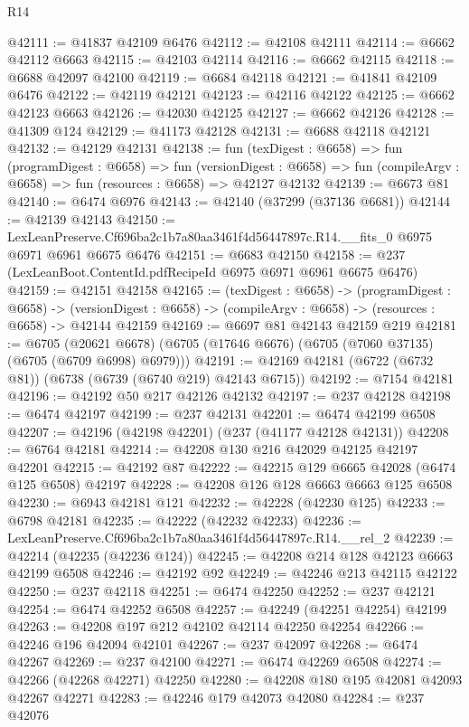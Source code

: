 \begin{lexlean}{R14}
\begin{coremodule}
@42111 := @41837 @42109 @6476
@42112 := @42108 @42111
@42114 := @6662 @42112 @6663
@42115 := @42103 @42114
@42116 := @6662 @42115
@42118 := @6688 @42097 @42100
@42119 := @6684 @42118
@42121 := @41841 @42109 @6476
@42122 := @42119 @42121
@42123 := @42116 @42122
@42125 := @6662 @42123 @6663
@42126 := @42030 @42125
@42127 := @6662 @42126
@42128 := @41309 @124
@42129 := @41173 @42128
@42131 := @6688 @42118 @42121
@42132 := @42129 @42131
@42138 := fun (texDigest : @6658) =>
  fun (programDigest : @6658) =>
  fun (versionDigest : @6658) =>
  fun (compileArgv : @6658) => fun (resources : @6658) => @42127 @42132
@42139 := @6673 @81
@42140 := @6474 @6976
@42143 := @42140 (@37299 (@37136 @6681))
@42144 := @42139 @42143
@42150 := LexLeanPreserve.Cf696ba2c1b7a80aa3461f4d56447897c.R14.__fits_0
    @6975
    @6971
    @6961
    @6675
    @6476
@42151 := @6683 @42150
@42158 := @237 (LexLeanBoot.ContentId.pdfRecipeId @6975 @6971 @6961 @6675 @6476)
@42159 := @42151 @42158
@42165 := (texDigest : @6658) ->
  (programDigest : @6658) ->
  (versionDigest : @6658) -> (compileArgv : @6658) -> (resources : @6658) -> @42144 @42159
@42169 := @6697 @81 @42143 @42159 @219
@42181 := @6705
    (@20621 @6678)
    (@6705 (@17646 @6676) (@6705 (@7060 @37135) (@6705 (@6709 @6998) @6979)))
@42191 := @42169 @42181 (@6722 (@6732 @81)) (@6738 (@6739 (@6740 @219) @42143 @6715))
@42192 := @7154 @42181
@42196 := @42192 @50 @217 @42126 @42132
@42197 := @237 @42128
@42198 := @6474 @42197
@42199 := @237 @42131
@42201 := @6474 @42199 @6508
@42207 := @42196 (@42198 @42201) (@237 (@41177 @42128 @42131))
@42208 := @6764 @42181
@42214 := @42208 @130 @216 @42029 @42125 @42197 @42201
@42215 := @42192 @87
@42222 := @42215 @129 @6665 @42028 (@6474 @125 @6508) @42197
@42228 := @42208 @126 @128 @6663 @6663 @125 @6508
@42230 := @6943 @42181 @121
@42232 := @42228 (@42230 @125)
@42233 := @6798 @42181
@42235 := @42222 (@42232 @42233)
@42236 := LexLeanPreserve.Cf696ba2c1b7a80aa3461f4d56447897c.R14.__rel_2
@42239 := @42214 (@42235 (@42236 @124))
@42245 := @42208 @214 @128 @42123 @6663 @42199 @6508
@42246 := @42192 @92
@42249 := @42246 @213 @42115 @42122
@42250 := @237 @42118
@42251 := @6474 @42250
@42252 := @237 @42121
@42254 := @6474 @42252 @6508
@42257 := @42249 (@42251 @42254) @42199
@42263 := @42208 @197 @212 @42102 @42114 @42250 @42254
@42266 := @42246 @196 @42094 @42101
@42267 := @237 @42097
@42268 := @6474 @42267
@42269 := @237 @42100
@42271 := @6474 @42269 @6508
@42274 := @42266 (@42268 @42271) @42250
@42280 := @42208 @180 @195 @42081 @42093 @42267 @42271
@42283 := @42246 @179 @42073 @42080
@42284 := @237 @42076

\end{coremodule}
\end{lexlean}
